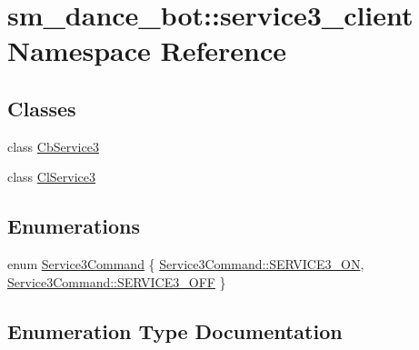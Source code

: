 \hypertarget{namespacesm__dance__bot_1_1service3__client}{}\section{sm\+\_\+dance\+\_\+bot\+:\+:service3\+\_\+client Namespace Reference}
\label{namespacesm__dance__bot_1_1service3__client}
\subsection*{Classes}
\begin{DoxyCompactItemize}
\item 
class \hyperlink{classsm__dance__bot_1_1service3__client_1_1CbService3}{Cb\+Service3}
\item 
class \hyperlink{classsm__dance__bot_1_1service3__client_1_1ClService3}{Cl\+Service3}
\end{DoxyCompactItemize}
\subsection*{Enumerations}
\begin{DoxyCompactItemize}
\item 
enum \hyperlink{namespacesm__dance__bot_1_1service3__client_a0c026b8bb6e886927f5f5b1750d90e63}{Service3\+Command} \{ \hyperlink{namespacesm__dance__bot_1_1service3__client_a0c026b8bb6e886927f5f5b1750d90e63a13cdca48a01bbb44fa8fb35567fbc58e}{Service3\+Command\+::\+S\+E\+R\+V\+I\+C\+E3\+\_\+\+ON}, 
\hyperlink{namespacesm__dance__bot_1_1service3__client_a0c026b8bb6e886927f5f5b1750d90e63a642ed22a7f6b816840289b4256116e9e}{Service3\+Command\+::\+S\+E\+R\+V\+I\+C\+E3\+\_\+\+O\+FF}
 \}
\end{DoxyCompactItemize}


\subsection{Enumeration Type Documentation}

